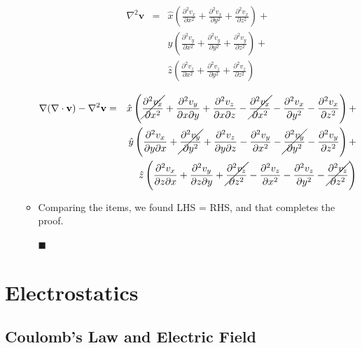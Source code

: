\documentclass[12pt,a4paper,twoside]{article}
\numberwithin{equation}{section}
\begin{document}
\begin{enumerate}
\begin{itemize}
			\begin{eqnarray*}
				\nabla^2\textbf{v} &=& \hat{x}\left(\frac{\partial^2 v_x}{\partial x^2}+\frac{\partial^2 v_x}{\partial y^2}+\frac{\partial^2 v_x}{\partial z^2}\right) + \\
				& & \hat{y}\left(\frac{\partial^2 v_y}{\partial x^2}+\frac{\partial^2 v_y}{\partial y^2}+\frac{\partial^2 v_y}{\partial z^2}\right) + \\
				& & \hat{z}\left(\frac{\partial^2 v_z}{\partial x^2}+\frac{\partial^2 v_z}{\partial y^2}+\frac{\partial^2 v_z}{\partial z^2}\right)
			\end{eqnarray*}
			
			\begin{eqnarray*}
				\nabla (\nabla \cdot \textbf{v}) - \nabla^2\textbf{v} &=& 
				\hat{x}\left(\cancel{\frac{\partial^2 v_x}{\partial x^2}} + \frac{\partial^2 v_y}{\partial x\partial y} + \frac{\partial^2 v_z}{\partial x\partial z} - \cancel{\frac{\partial^2 v_x}{\partial x^2}} -\frac{\partial^2 v_x}{\partial y^2}-\frac{\partial^2 v_x}{\partial z^2} \right) +\\
				& & \hat{y}\left(\frac{\partial^2 v_x}{\partial y\partial x}+\cancel{\frac{\partial^2 v_y}{\partial y^2}}+\frac{\partial^2 v_z}{\partial y\partial z}-\frac{\partial^2 v_y}{\partial x^2}-\cancel{\frac{\partial^2 v_y}{\partial y^2}}-\frac{\partial^2 v_y}{\partial z^2} \right) +\\
				& & \hat{z}\left(\frac{\partial^2 v_x}{\partial z \partial x}+\frac{\partial^2 v_y}{\partial z\partial y} +\cancel{\frac{\partial^2 v_z}{\partial z^2}}-\frac{\partial^2 v_z}{\partial x^2}-\frac{\partial^2 v_z}{\partial y^2}-\cancel{\frac{\partial^2 v_z}{\partial z^2}} \right)
			\end{eqnarray*}
			\item Comparing the items, we found LHS = RHS, and that completes the proof.
			\begin{flushright}
				$\blacksquare$
			\end{flushright}
			
			
		\end{itemize}
	\end{enumerate}
	
\section{Electrostatics}
\subsection{Coulomb's Law and Electric Field}
\end{document}
